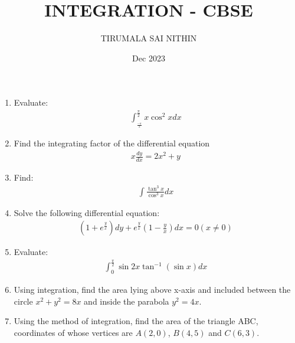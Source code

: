 \documentclass[12pt,-letter paper]{article}
\providecommand{\brak}[1]{\ensuremath{\left(#1\right)}}
\begin{document}
\title{INTEGRATION - CBSE}
\author{TIRUMALA SAI NITHIN}
\date{Dec 2023}
\maketitle
\begin{enumerate}
\item Evaluate:
	\begin{align}
		\int^{\frac{\pi}{2}}_{_\frac{-\pi}{2}}x \cos^2x dx 
	\end{align}
		\item Find the integrating factor of the differential equation
\begin{align}
	x \frac{dy}{dx} = 2x^2 + y
\end{align}
\item Find:
\begin{align}
	\int \frac{\tan^3 x}{\cos^3 x} dx
\end{align}
\item Solve the following differential equation:
\begin{align}
	\brak{1+e^\frac{y}{x}}dy + e^\frac{y}{x}\brak{1-\frac{y}{x}} dx = 0 \brak{x \neq 0}
\end{align}
\item Evaluate:
\begin{align}
         \int^{\frac{\pi}{2}}_{0} \sin 2x \tan^{-1} (\sin x) dx
\end{align}
\item Using integration, find the area lying above x-axis and included between the circle $x^2 + y^2 = 8x$ and inside the parabola $y^2 = 4x$.
\item Using the method of integration, find the area of the triangle ABC, coordinates of whose vertices are $A\brak{2,0}$, $B\brak{4,5}$ and $C\brak{6,3}$.
\end{enumerate}
\end{document}
